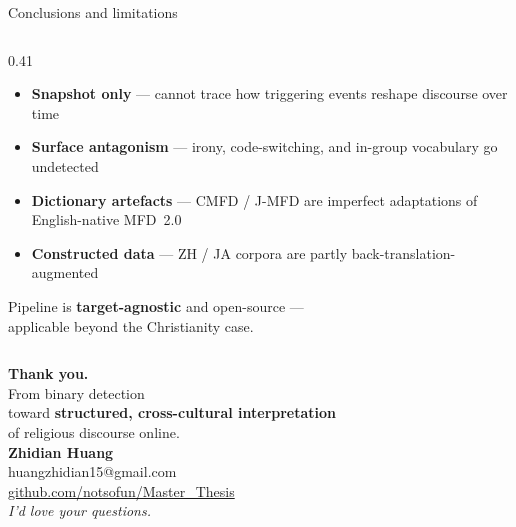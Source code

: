 \documentclass[aspectratio=169,10pt]{beamer}
\newcommand{\emphc}[1]{\textcolor{uzhaccent}{\textbf{#1}}}
\newcommand{\keyword}[1]{\textcolor{uzhblue}{\textbf{#1}}}
\begin{document}
\begin{frame}{Conclusions and limitations}
\begin{columns}[T,onlytextwidth]
\begin{column}{0.41\textwidth}
      \begin{itemize}\footnotesize\itemsep5pt
        \item[\textcolor{uzhaccent}{$\blacktriangleright$}]
          \textbf{Snapshot only} — cannot trace how triggering events
          reshape discourse over time
        \item[\textcolor{uzhaccent}{$\blacktriangleright$}]
          \textbf{Surface antagonism} — irony, code-switching, and
          in-group vocabulary go undetected
        \item[\textcolor{uzhaccent}{$\blacktriangleright$}]
          \textbf{Dictionary artefacts} — CMFD / J-MFD are imperfect
          adaptations of English-native MFD~2.0
        \item[\textcolor{uzhaccent}{$\blacktriangleright$}]
          \textbf{Constructed data} — ZH / JA corpora are partly
          back-translation-augmented
      \end{itemize}

      \vspace{0.5em}
      \footnotesize\textcolor{mutedgray}{Pipeline is
      \keyword{target-agnostic} and open-source —\\
      applicable beyond the Christianity case.}
    \end{column}

  \end{columns}
\end{frame}

\begin{frame}[plain]
  \vspace{1.5cm}
  \centering
  {\Large\textcolor{uzhblue}{\textbf{Thank you.}}}\\[0.8em]
  {\small From binary detection\\
  toward \emphc{structured, cross-cultural interpretation}\\
  of religious discourse online.}\\[1.2em]
  \small
  \textbf{Zhidian Huang}\\
  huangzhidian15@gmail.com\\
  \href{https://github.com/notsofun/Master_Thesis}{github.com/notsofun/Master\_Thesis}
  \vspace{0.8em}\\
  \footnotesize\textit{I'd love your questions.}
\end{frame}
\end{document}
